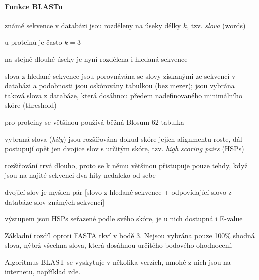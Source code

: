 \documentclass[DIV=8]{scrreprt}
\begin{document}
\paragraph{Funkce BLASTu}
\begin{myEnumerate}[nosep]
    \item známé sekvence v databázi jsou rozděleny na úseky délky \(k\), tzv. \emph{slova} (words)
\begin{myItemize}[nosep]
    \item u proteinů je často \(k = 3\)
\end{myItemize}

    \item na stejně dlouhé úseky je nyní rozdělena i hledaná sekvence
    \item slova z hledané sekvence jsou porovnávána se slovy získanými ze sekvencí v databázi a podobnosti jsou oskórovány tabulkou (bez mezer); jsou vybrána taková slova z databáze, která dosáhnou předem nadefinovaného minimálního skóre (threshold)
\begin{myItemize}[nosep]
    \item pro proteiny se většinou používá běžná Blosum 62 tabulka
\end{myItemize}

    \item vybraná slova (\emph{hity}) jsou rozšířována dokud skóre jejich alignmentu roste, dál postupují opět jen dvojice slov s určitým skóre, tzv. \emph{high scoring pairs} (HSPs)
\begin{myItemize}[nosep]
    \item rozšiřování trvá dlouho, proto se k němu většinou přistupuje pouze tehdy, když jsou na najité sekvenci dva hity nedaleko od sebe
    \item dvojicí slov je myšlen pár [slovo z hledané sekvence + odpovídající slovo z databáze slov známých sekvencí]
\end{myItemize}

    \item výstupem jsou HSPs seřazené podle svého skóre, je u nich dostupná i \hyperref[Parametry významnosti alignmentu]{E-value}
\end{myEnumerate}



Základní rozdíl oproti FASTA tkví v bodě 3. Nejsou vybrána pouze 100\% shodná slova, nýbrž všechna slova, která dosáhnou určitého bodového ohodnocení.

Algoritmus BLAST se vyskytuje v několika verzích, mnohé z nich jsou na internetu, například \href{https://blast.ncbi.nlm.nih.gov/Blast.cgi}{zde}.
\end{document}
